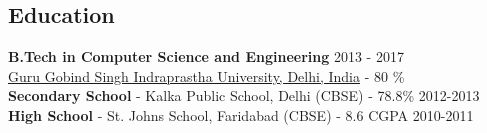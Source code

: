 \documentclass[margin, centered]{res}
\begin{document}
\begin{resume}

\section{Education}
\textbf{B.Tech in Computer Science and Engineering} \hfill 2013 - 2017 \textbf \\
\href{http://ipu.ac.in/}{Guru Gobind Singh Indraprastha University, Delhi, India} - {80 \%} \\ 
\textbf{Secondary School} - Kalka Public School, Delhi (CBSE) - 78.8\% \hfill 2012-2013\\
\textbf{High School} - St. Johns School, Faridabad (CBSE) - 8.6 CGPA \hfill 2010-2011
 

\end{resume}
\end{document}
